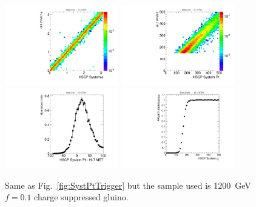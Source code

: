 \begin{figure}
  \begin{center}
      \includegraphics[clip=true, trim=0.0cm 0cm 3.0cm 0cm, width=0.44\textwidth]{figures/search/Gluino_8TeV_M1200N_f10SystPhiMET}
      \includegraphics[clip=true, trim=0.0cm 0cm 3.0cm 0cm, width=0.44\textwidth]{figures/search/Gluino_8TeV_M1200N_f10SystPtMET} \\
      \includegraphics[clip=true, trim=0.0cm 0cm 3.0cm 0cm, width=0.44\textwidth]{figures/search/Gluino_8TeV_M1200N_f10SystPtDiffMET}
      \includegraphics[clip=true, trim=0.0cm 0cm 3.0cm 0cm, width=0.44\textwidth]{figures/search/Gluino_8TeV_M1200N_f10SystPtEff}
      \caption[Comparison of di-HSCP system $\phi$ and \pt\ with online PFMET for a 1200~GeV
Gluino $f=0.1$ charge suppressed sample in events with at least 150~GeV of online PFMET]
      {Same as Fig.~\ref{fig:SystPtTrigger} but the sample used is 1200~GeV $f=0.1$ charge suppressed gluino.
        }
      \label{fig:SystPtTriggerN}
  \end{center}
\end{figure}

